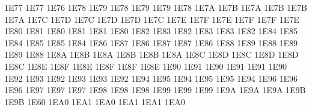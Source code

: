 \setcclcucx 1E77 1E77 1E76 %
\setcclcucx 1E78 1E79 1E78 %
\setcclcucx 1E79 1E79 1E78 %
\setcclcucx 1E7A 1E7B 1E7A %
\setcclcucx 1E7B 1E7B 1E7A %
\setcclcucx 1E7C 1E7D 1E7C %
\setcclcucx 1E7D 1E7D 1E7C %
\setcclcucx 1E7E 1E7F 1E7E %
\setcclcucx 1E7F 1E7F 1E7E %
\setcclcucx 1E80 1E81 1E80 %
\setcclcucx 1E81 1E81 1E80 %
\setcclcucx 1E82 1E83 1E82 %
\setcclcucx 1E83 1E83 1E82 %
\setcclcucx 1E84 1E85 1E84 %
\setcclcucx 1E85 1E85 1E84 %
\setcclcucx 1E86 1E87 1E86 %
\setcclcucx 1E87 1E87 1E86 %
\setcclcucx 1E88 1E89 1E88 %
\setcclcucx 1E89 1E89 1E88 %
\setcclcucx 1E8A 1E8B 1E8A %
\setcclcucx 1E8B 1E8B 1E8A %
\setcclcucx 1E8C 1E8D 1E8C %
\setcclcucx 1E8D 1E8D 1E8C %
\setcclcucx 1E8E 1E8F 1E8E %
\setcclcucx 1E8F 1E8F 1E8E %
\setcclcucx 1E90 1E91 1E90 %
\setcclcucx 1E91 1E91 1E90 %
\setcclcucx 1E92 1E93 1E92 %
\setcclcucx 1E93 1E93 1E92 %
\setcclcucx 1E94 1E95 1E94 %
\setcclcucx 1E95 1E95 1E94 %
\setcclcucx 1E96 1E96 1E96 %
\setcclcucx 1E97 1E97 1E97 %
\setcclcucx 1E98 1E98 1E98 %
\setcclcucx 1E99 1E99 1E99 %
\setcclcucx 1E9A 1E9A 1E9A %
\setcclcucx 1E9B 1E9B 1E60 %
\setcclcucx 1EA0 1EA1 1EA0 %
\setcclcucx 1EA1 1EA1 1EA0 %
